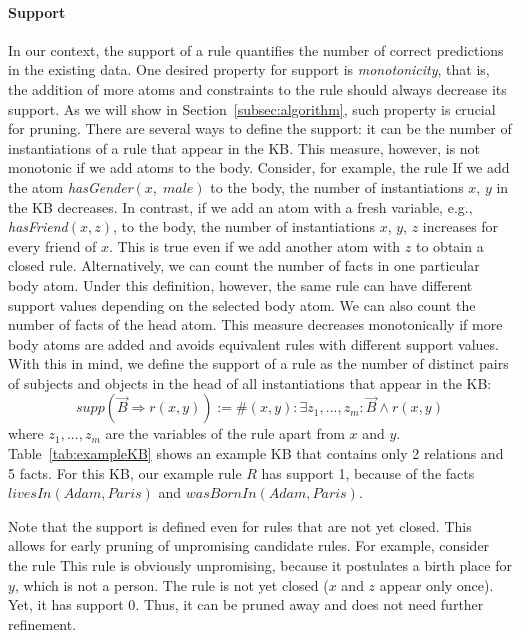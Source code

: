 \paragraph{Support} \label{support}In our context, the support of a rule quantifies the number of correct predictions in the existing data.
One desired property for support is \emph{monotonicity}, that is, the addition of more atoms and constraints to the rule should 
always decrease its support. As we will show in Section~\ref{subsec:algorithm}, such property is crucial for pruning.
There are several ways to define the support: it can be the number of instantiations of a rule that appear in the KB.
This measure, however, is not monotonic if we add atoms to the body. Consider, for example, the rule
If we add the atom \emph{hasGender}$(x,\;male)$ to the body, the number of instantiations $x$, $y$ in the KB decreases.
In contrast, if we add an atom with a fresh variable, e.g., \emph{hasFriend}$(x,z)$, to the body, 
the number of instantiations $x$, $y$, $z$ increases for every friend of $x$. This is true even 
if we add another atom with $z$ to obtain a closed rule.
Alternatively, we can count the number of facts in one particular body atom.
Under this definition, however, 
the same rule can have different support values depending on the selected body atom.
We can also count the number of facts of the head atom.
This measure decreases monotonically if more body atoms are added and avoids equivalent rules with different support values.
With this in mind, we define the support of a rule as the number of distinct pairs of subjects 
and objects in the head of all instantiations that appear in the KB:
\[supp(\vec{B} \Rightarrow r(x,y)) := \#(x,y): \exists z_1,...,z_m: \vec{B} \wedge r(x,y)\]
where $z_1,...,z_m$ are the variables of the rule apart from $x$ and $y$.
Table~\ref{tab:exampleKB} shows an example KB that contains only 2 relations and 5 facts. For this KB, 
our example rule $R$ has support 1, because of the facts $livesIn(Adam,Paris)$ and $wasBornIn(Adam,Paris)$.

Note that the support is defined even for rules that are not yet closed. This allows for early pruning of unpromising candidate rules. For example, consider the rule
This rule is obviously unpromising, because it postulates a birth place for $y$, which is not a person. The rule is not yet closed ($x$ and $z$ appear only once). Yet, it has support 0. Thus, it can be pruned away and does not need further refinement.

